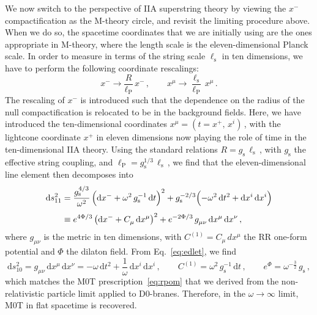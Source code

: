 \documentclass[11pt]{article}
\newcommand{\be}{\begin{equation}}
\newcommand{\ee}{\end{equation}}
\newcommand{\dd}{\mathrm{d}}
\begin{document}
We now switch to the perspective of IIA superstring theory by viewing the $x^-$ compactification as the M-theory circle, and revisit the limiting procedure above. When we do so, the spacetime coordinates that we are initially using are the ones appropriate in M-theory, where the length scale is the eleven-dimensional Planck scale. In order to measure in terms of the string scale $\ell^{}_\text{s}$ in ten dimensions, we have to perform the following coordinate rescalings:
%
\be
    x^- \rightarrow \frac{R}{\ell^{}_\text{P}} \, x^-\,,
        \qquad%
    x^\mu \rightarrow \frac{\ell^{}_\text{s}}{\ell^{}_\text{P}} \, x^\mu\,.
\ee
%
The rescaling of $x^-$ is introduced such that the dependence on the radius of the null compactification is relocated to be in the background fields. 
Here, we have introduced the ten-dimensional coordinates $x^\mu = (t = x^+, \, x^i)$\,, with the lightcone coordinate $x^+$ in eleven dimensions now playing the role of time in the ten-dimensional IIA theory. Using the standard relations $R = g^{}_\text{s} \, \ell^{}_\text{s}$\,, with $g^{}_\text{s}$ the effective string coupling, and $\ell^{}_\text{P} = g^{1/3}_\text{s} \, \ell^{}_\text{s}$\,, we find that the eleven-dimensional line element then decomposes into
%
\begin{align} \label{eq:edlet}
\begin{split}
    \dd s^2_{11} & = \frac{g^{4/3}_\text{s}}{\omega^{2}} \, \Bigl( \dd x^- + \omega^2 \, g^{-1}_\text{s} \, \dd t \Bigr)^2 + g^{-2/3}_\text{s} \Bigl( - \omega^2 \, \dd t^2 + \dd x^i \, \dd x^i \Bigr) \\[4pt]
    & \equiv e^{4\Phi/3} \, \bigl( \dd x^- + C^{}_\mu \, \dd x^\mu \bigr)^2 + e^{-2\Phi/3} \, g^{}_{\mu\nu} \, \dd x^\mu \, \dd x^\nu\,,
\end{split}
\end{align}
%
where $g_{\mu\nu}$ is the metric in ten dimensions, with $C^{(1)} = C_\mu \, dx^\mu$ the RR one-form potential and $\Phi$ the dilaton field. From Eq.~\eqref{eq:edlet}, we find
%
\be \label{eq:sten}
    \dd s^2_{10} = g^{}_{\mu\nu} \, \dd x^\mu \, \dd x^\nu = - \omega \, \dd t^2 + \frac{1}{\omega} \, \dd x^i \, \dd x^i\,,
        \qquad%
    C^{(1)} = \omega^2 \, g^{-1}_\text{s} \, \dd t\,,
        \qquad%
    e^\Phi = \omega^{-\frac{3}{2}} \, g^{}_\text{s}\,,
\ee
%
which matches the M0T prescription~\eqref{eq:rpom} that we derived from the non-relativistic particle limit applied to D0-branes. Therefore, in the $\omega \rightarrow \infty$ limit, M0T in flat spacetime is recovered.  
\end{document}
